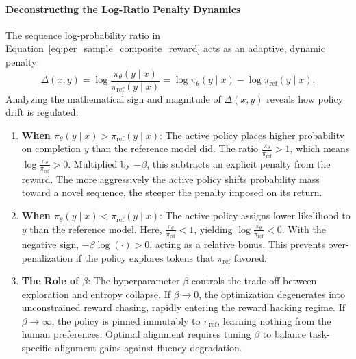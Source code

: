 \documentclass[../../main.tex]{subfiles}
\begin{document}
\paragraph{Deconstructing the Log-Ratio Penalty Dynamics}
The sequence log-probability ratio in Equation~\eqref{eq:per_sample_composite_reward} acts as an adaptive, dynamic penalty:
\begin{equation}
\Delta(x, y) = \log \frac{\pi_\theta(y \mid x)}{\pi_{\text{ref}}(y \mid x)} = \log \pi_\theta(y \mid x) - \log \pi_{\text{ref}}(y \mid x).
\end{equation}
Analyzing the mathematical sign and magnitude of $\Delta(x, y)$ reveals how policy drift is regulated:
\begin{enumerate}
    \item \textbf{When $\pi_\theta(y \mid x) > \pi_{\text{ref}}(y \mid x)$}: The active policy places higher probability on completion $y$ than the reference model did. The ratio $\frac{\pi_\theta}{\pi_{\text{ref}}} > 1$, which means $\log \frac{\pi_\theta}{\pi_{\text{ref}}} > 0$. Multiplied by $-\beta$, this subtracts an explicit penalty from the reward. The more aggressively the active policy shifts probability mass toward a novel sequence, the steeper the penalty imposed on its return.
    \item \textbf{When $\pi_\theta(y \mid x) < \pi_{\text{ref}}(y \mid x)$}: The active policy assigns lower likelihood to $y$ than the reference model. Here, $\frac{\pi_\theta}{\pi_{\text{ref}}} < 1$, yielding $\log \frac{\pi_\theta}{\pi_{\text{ref}}} < 0$. With the negative sign, $-\beta \log(\cdot) > 0$, acting as a relative bonus. This prevents over-penalization if the policy explores tokens that $\pi_{\text{ref}}$ favored.
    \item \textbf{The Role of $\beta$}: The hyperparameter $\beta$ controls the trade-off between exploration and entropy collapse. If $\beta \to 0$, the optimization degenerates into unconstrained reward chasing, rapidly entering the reward hacking regime. If $\beta \to \infty$, the policy is pinned immutably to $\pi_{\text{ref}}$, learning nothing from the human preferences. Optimal alignment requires tuning $\beta$ to balance task-specific alignment gains against fluency degradation.
\end{enumerate}
\end{document}
